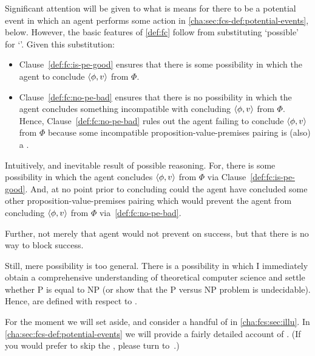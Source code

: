 \begin{note}[Intuition]
  Significant attention will be given to what is means for there to be a potential event in which an agent performs some action in \autoref{cha:sec:fcs-def:potential-events}, below.
  However, the basic features of \autoref{def:fc} follow from substituting `possible' for `\pevent{}'.
  Given this substitution:

  \begin{itemize}[noitemsep]
  \item
    Clause~\ref{def:fc:is-pe-good} ensures that there is some possibility in which the agent to conclude \(\langle \phi, v \rangle\) from \(\Phi\).
  \item
    Clause~\ref{def:fc:no-pe-bad} ensures that there is no possibility in which the agent concludes something incompatible with concluding \(\langle \phi, v \rangle\) from \(\Phi\).
    Hence, Clause~\ref{def:fc:no-pe-bad} rules out the agent failing to conclude \(\langle \phi, v \rangle\) from \(\Phi\) because some incompatible proposition-value-premises pairing is (also) a .
  \end{itemize}

  Intuitively, and inevitable result of possible reasoning.
  For, there is some possibility in which the agent concludes \(\langle \phi, v \rangle\) from \(\Phi\) via Clause~\ref{def:fc:is-pe-good}.
  And, at no point prior to concluding could the agent have concluded some other proposition-value-premises pairing which would prevent the agent from concluding \(\langle \phi, v \rangle\) from \(\Phi\) via~\ref{def:fc:no-pe-bad}.

  Further, not merely that agent would not prevent on success, but that there is no way to block success.
\end{note}

\begin{note}
  Still, mere possibility is too general.
  There is a possibility in which I immediately obtain a comprehensive understanding of theoretical computer science and settle whether P is equal to NP (or show that the P versus NP problem is undecidable).
  Hence,  are defined with respect to .

  For the moment we will set  aside, and consider a handful of  in \autoref{cha:fcs:sec:illu}.
  In \autoref{cha:sec:fcs-def:potential-events} we will provide a fairly detailed account of .
  (If you would prefer to skip the , please turn to~.)
\end{note}


